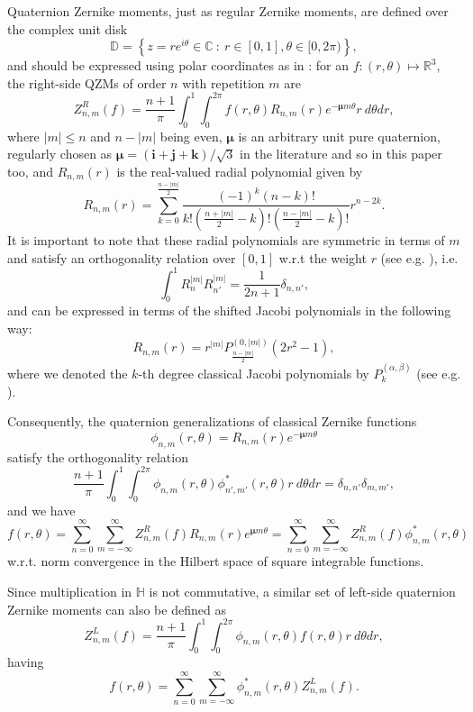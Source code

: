 \documentclass[12pt]{article}
\newcommand{\R}{\mathbb{R}}
\newcommand{\C}{\mathbb{C}}
\newcommand{\Hq}{\mathbb{H}}
\newcommand{\D}{\mathbb{D}}
\newcommand{\qi}{\textbf{i}}
\newcommand{\qj}{\textbf{j}}
\newcommand{\qk}{\textbf{k}}
\newcommand{\qmu}{\boldsymbol{\mu}}
\begin{document}
Quaternion Zernike moments, just as regular Zernike moments, are defined over the complex unit disk
\[
	\D = \left\{ z = re^{i\theta}\in\C \ :\ r\in[0,1],\theta\in[0,2\pi)\right\},
\]
and should be expressed using polar coordinates as in \cite{ChenOriginal}: for an $f: (r,\theta)\mapsto\R^3$, the right-side QZMs of order $n$ with repetition $m$ are
\begin{equation}\label{QZRM}
	Z_{n,m}^R (f) = \frac{n+1}{\pi} \int_0^1 \int_0^{2\pi} f(r,\theta) R_{n,m}(r) e^{-\qmu m\theta} r \ d\theta dr,
\end{equation}
where $|m|\leq n$ and $n-|m|$ being even, $\qmu$ is an arbitrary unit pure quaternion, regularly chosen as $\qmu = (\qi+\qj+\qk)/\sqrt{3}$ in the literature and so in this paper too, and $R_{n,m}(r)$ is the real-valued radial polynomial given by
\[
	R_{n,m}(r) = \sum_{k=0}^{\frac{n - |m|}{2}}\frac{(-1)^k (n - k)!}{k!\left(\frac{n + |m|}{2} - k\right)!\left(\frac{n - |m|}{2} - k\right)!}r^{n-2k}.
\]
It is important to note that these radial polynomials are symmetric in terms of $m$ and satisfy an orthogonality relation over $[0,1]$ w.r.t the weight $r$ (see e.g. \cite{PapSchipp}), i.e.
\[
	\int_0^1 R_n^{|m|} R_{n'}^{|m|}  = \frac{1}{2n+1} \delta_{n,n'},
\]
and can be expressed in terms of the shifted Jacobi polynomials in the following way:
\[
	R_{n,m}(r) = r^{|m|} P_{\frac{n - |m|}{2}}^{(0,|m|)}(2r^2-1),
\]
where we denoted the $k$-th degree classical Jacobi polynomials by $P_k^{(\alpha,\beta)}$ (see e.g. \cite{Szego}).

Consequently, the quaternion generalizations of classical Zernike functions
\[
	\phi_{n,m}(r,\theta) = R_{n,m}(r) e^{-\qmu m\theta}
\]
satisfy the orthogonality relation
\[
	\frac{n+1}{\pi} \int_0^1 \int_0^{2\pi} \phi_{n,m}(r,\theta) \phi^*_{n',m'}(r,\theta) r \ d\theta dr = \delta_{n,n'}\delta_{m,m'},
\]
and we have
\[
	f(r,\theta) = \sum_{n=0}^{\infty}\sum_{m=-\infty}^{\infty} Z_{n,m}^R(f) R_{n,m}(r)e^{\qmu m\theta} =
		\sum_{n=0}^{\infty}\sum_{m=-\infty}^{\infty} Z_{n,m}^R(f) \phi^*_{n,m}(r,\theta)
\]
w.r.t. norm convergence in the Hilbert space of square integrable functions.

Since multiplication in $\Hq$ is not commutative, a similar set of left-side quaternion Zernike moments can also be defined as
\begin{equation}\label{QZLM}
	Z_{n,m}^L(f) = \frac{n + 1}{\pi}\int_0^1\int_0^{2\pi} \phi_{n,m}(r,\theta) f(r,\theta)r \ d\theta dr,
\end{equation}
having
\[
	f(r,\theta) = \sum_{n=0}^{\infty}\sum_{m=-\infty}^{\infty} \phi^*_{n,m}(r,\theta) Z_{n,m}^L(f).
\]
\end{document}
